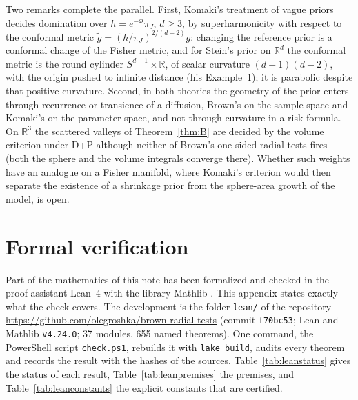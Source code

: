 \documentclass[11pt]{amsart}
\newcommand{\R}{\mathbb{R}}
\theoremstyle{plain}
\theoremstyle{definition}
\theoremstyle{remark}
\begin{document}
Two remarks complete the parallel. First, Komaki's treatment of vague priors
\cite[\S3]{komaki2006} decides domination over $h=e^{-\Phi}\pi_J$, $d\ge3$, by
superharmonicity with respect to the conformal metric
$\tilde g=(h/\pi_J)^{2/(d-2)}g$: changing the reference prior is a conformal
change of the Fisher metric, and for Stein's prior on $\R^d$ the conformal
metric is the round cylinder $S^{d-1}\times\R$, of scalar curvature
$(d-1)(d-2)$, with the origin pushed to infinite distance (his Example~1); it is
parabolic despite that positive curvature. Second, in both theories the geometry of the
prior enters through recurrence or transience of a diffusion, Brown's on the
sample space and Komaki's on the parameter space, and not through curvature in
a risk formula. On $\R^3$ the scattered valleys of Theorem~\ref{thm:B} are
decided by the volume criterion under D+P although neither of Brown's
one-sided radial tests fires (both the sphere and the volume integrals converge
there). Whether such weights have an analogue on a Fisher manifold, where
Komaki's criterion would then separate the existence of a shrinkage prior from
the sphere-area growth of the model, is open.

\section{Formal verification}\label{app:lean}

Part of the mathematics of this note has been formalized and checked in the
proof assistant Lean~4 \cite{demouraullrich2021} with the library Mathlib
\cite{mathlib2020}. This appendix states exactly what the check covers. The
development is the folder \texttt{lean/} of the repository
\url{https://github.com/olegroshka/brown-radial-tests} (commit
\texttt{f70bc53}; Lean and Mathlib \texttt{v4.24.0}; 37 modules, 655 named
theorems). One command, the PowerShell script \texttt{check.ps1}, rebuilds it
with \texttt{lake build}, audits every theorem and records the result with the
hashes of the sources. Table~\ref{tab:leanstatus} gives the status of each
result, Table~\ref{tab:leanpremises} the premises, and
Table~\ref{tab:leanconstants} the explicit constants that are certified.
\end{document}
